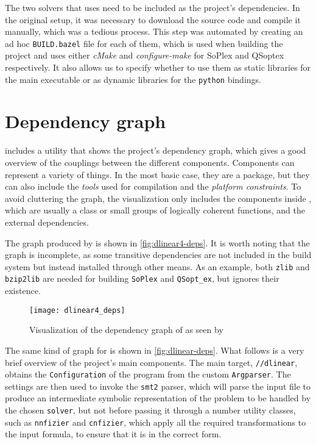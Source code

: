 The two solvers that \dlinear uses need to be included as the project's dependencies.
In the original setup, it was necessary to download the source code and compile it manually, which was a tedious process.
This step was automated by creating an ad hoc \texttt{BUILD.bazel} file for each of them, which is used when building the project and uses either \textit{cMake} and \textit{configure-make} for SoPlex and QSoptex respectively.
It also allows us to specify whether to use them as static libraries for the main executable or as dynamic libraries for the \texttt{python} bindings.



\section*{Dependency graph}
\label{sec:dependency_graph}

\bazel includes a utility that shows the project's dependency graph, which gives a good overview of the couplings between the different components.
Components can represent a variety of things.
In the most basic case, they are a \bazel package, but they can also include the \textit{tools} used for compilation and the \textit{platform constraints}.
To avoid cluttering the graph, the visualization only includes the components inside \dlinear, which are usually a class or small groups of logically coherent functions, and the external dependencies.

The graph produced by \dlinearfour is shown in \autoref{fig:dlinear4-deps}.
It is worth noting that the graph is incomplete, as some transitive dependencies are not included in the \bazel build system but instead installed through other means.
As an example, both \texttt{zlib} and \texttt{bzip2lib} are needed for building \texttt{SoPlex} and \texttt{QSopt\_ex}, but \bazel ignores their existence.

\begin{figure}[!h]
    \centering
    \texttt{[image: dlinear4\_deps]}
    \caption{Visualization of the dependency graph of \dlinearfour as seen by \bazel}\label{fig:dlinear4-deps}
\end{figure}

\clearpage

The same kind of graph for \dlinear is shown in \autoref{fig:dlinear-deps}.
What follows is a very brief overview of the project's main components.
The main target, \texttt{//dlinear}, obtains the \texttt{Configuration} of the program from the custom \texttt{Argparser}.
The settings are then used to invoke the \texttt{smt2} parser, which will parse the input file to produce an intermediate symbolic representation of the problem to be handled by the chosen \texttt{solver}, but not before passing it through a number utility classes, such as \texttt{nnfizier} and \texttt{cnfizier}, which apply all the required transformations to the input formula, to ensure that it is in the correct form.

